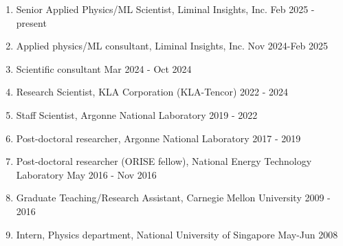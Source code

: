 \begin{enumerate}
    \item Senior Applied Physics/ML Scientist, Liminal Insights, Inc. \hfill Feb 2025 - present
    \item Applied physics/ML consultant, Liminal Insights, Inc. \hfill Nov 2024-Feb 2025
    \item Scientific consultant \hfill Mar 2024 - Oct 2024
    \item Research Scientist, KLA Corporation (KLA-Tencor) \hfill 2022 - 2024
    \item Staff Scientist, Argonne National Laboratory \hfill 2019 - 2022
    \item Post-doctoral researcher, Argonne National Laboratory \hfill 2017 - 2019
    \item Post-doctoral researcher (ORISE fellow), National Energy Technology Laboratory  \hfill May 2016 - Nov 2016
    \item Graduate Teaching/Research Assistant, Carnegie Mellon University \hfill 2009 - 2016
    \item Intern, Physics department, National University of Singapore \hfill May-Jun 2008 
\end{enumerate}